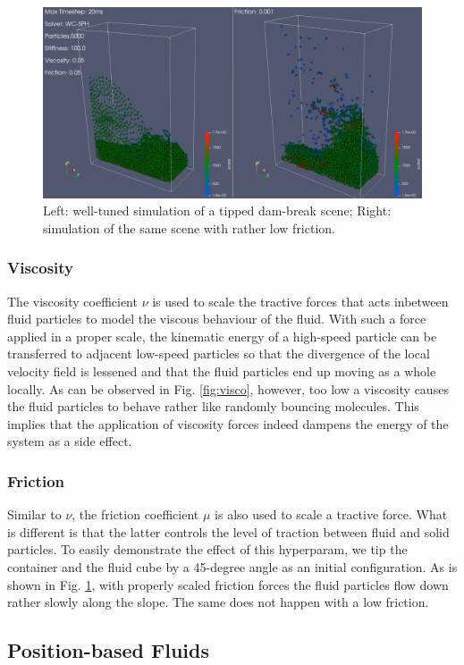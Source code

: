 \documentclass[
	11pt, 
	DIV10,
	ngerman,
	a4paper, 
	oneside, 
	headings=normal, 
	captions=tableheading,
	final, 
	numbers=noenddot
]{scrartcl}
\begin{document}
\begin{figure}
    \centering
    \includegraphics[width=.6\textwidth]{pics/wcsph_friction.png}
    \caption{Left: well-tuned simulation of a tipped dam-break scene; Right: simulation of the same scene with rather low friction.}
    \label{fig:frict}
\end{figure}

\subsubsection{Viscosity}

The viscosity coefficient $ \nu $ is used to scale the tractive forces that acts inbetween fluid particles to model the viscous behaviour of the fluid. With such a force applied in a proper scale, the kinematic energy of a high-speed particle can be transferred to adjacent low-speed particles so that the divergence of the local velocity field is lessened and that the fluid particles end up moving as a whole locally. As can be observed in Fig. \ref{fig:visco}, however, too low a viscosity causes the fluid particles to behave rather like randomly bouncing molecules. This implies that the application of viscosity forces indeed dampens the energy of the system as a side effect.

\subsubsection{Friction}

Similar to $ \nu $, the friction coefficient $ \mu $ is also used to scale a tractive force. What is different is that the latter controls the level of traction between fluid and solid particles. To easily demonstrate the effect of this hyperparam, we tip the container and the fluid cube by a 45-degree angle as an initial configuration. As is shown in Fig. \ref{fig:frict}, with properly scaled friction forces the fluid particles flow down rather slowly along the slope. The same does not happen with a low friction.

\subsection{Position-based Fluids}
\end{document}

